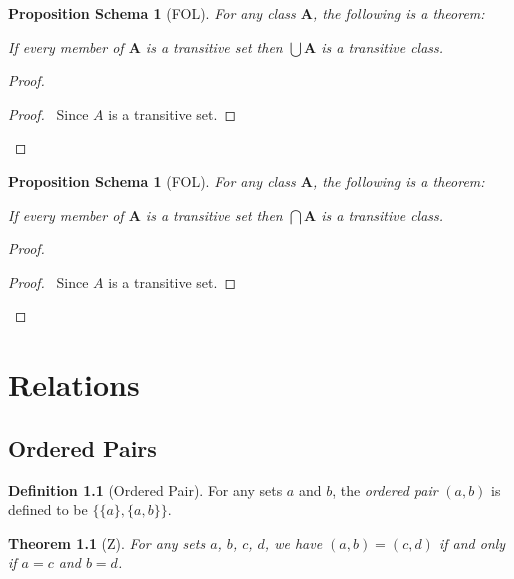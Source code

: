 \documentclass{book}
\let\qed\relax
\newtheorem{props}[ax]{Proposition Schema}
\newtheorem{thm}[ax]{Theorem}
\theoremstyle{definition}
\newtheorem{df}[ax]{Definition}
\begin{document}
\begin{props}[FOL]
For any class $\mathbf{A}$, the following is a theorem:

If every member of $\mathbf{A}$ is a transitive set then $\bigcup \mathbf{A}$ is a transitive class.
\end{props}

\begin{proof}
\pf
{}
\begin{proof}
	\pf\ Since $A$ is a transitive set.
\end{proof}
\qed
\end{proof}

\begin{props}[FOL]
For any class $\mathbf{A}$, the following is a theorem:

If every member of $\mathbf{A}$ is a transitive set then $\bigcap \mathbf{A}$ is a transitive class.
\end{props}

\begin{proof}
\pf
{}
\begin{proof}
	\pf\ Since $A$ is a transitive set.
\end{proof}
\qed
\end{proof}

\chapter{Relations}

\section{Ordered Pairs}

\begin{df}[Ordered Pair]
For any sets $a$ and $b$, the \emph{ordered pair} $(a,b)$ is defined to be $\{ \{ a \}, \{a , b \} \}$.
\end{df}

\begin{thm}[Z]
For any sets $a$, $b$, $c$, $d$, we have $(a,b) = (c,d)$ if and only if $a = c$ and $b = d$.
\end{thm}
\end{document}

